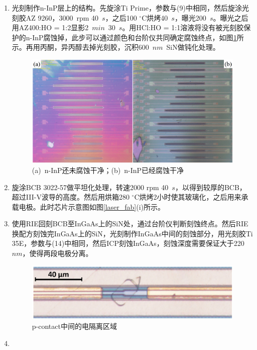 \begin{enumerate}[(1)]
	\item 
	光刻制作n-InP层上的结构。先旋涂Ti Prime，参数与(9)中相同，然后旋涂光刻胶AZ 9260，3000~rpm 40~$s$，之后100 $^{\circ}$C烘烤40~$s$，曝光200~$s$。曝光之后用AZ400:HO = 1:2显影2~$min$~30~$s$。用HCl:HO = 1:1溶液将没有被光刻胶保护的n-InP腐蚀掉，此步可以通过颜色和台阶仪共同确定腐蚀终点，如图\ref{laser_island}所示。再用丙酮，异丙醇去掉光刻胶，沉积600~$nm$~SiN做钝化处理。
	\begin{figure}[htb]
		\centering
		\includegraphics[width=14cm]{./Pictures/laser_island.jpg}
		\captionsetup{justification=centering}
		\caption{(a)~n-InP还未腐蚀干净；(b)~n-InP已经腐蚀干净}
		\label{laser_island}
	\end{figure}
	\item 
	旋涂BCB 3022-57做平坦化处理，转速2000 rpm 40~$s$，以得到较厚的BCB，超过III-V波导的高度。然后用烘箱280 $^{\circ}$C烘烤2小时使其玻璃化，之后用来承载电极。此时芯片示意图如图\ref{laser_fab}(i)所示。
	\item 
	使用RIE回刻BCB至InGaAs上的SiN处，通过台阶仪判断刻蚀终点。然后RIE换配方刻蚀完InGaAs上的SiN，光刻制作InGaAs中间的刻蚀部分，用光刻胶Ti 35E，参数与(14)中相同，然后ICP刻蚀InGaAs，刻蚀深度需要保证大于220~$nm$，使得两段电极分离。
	\begin{figure}[htb]
		\centering
		\includegraphics[width=14cm]{./Pictures/laser_cut.jpg}
		\captionsetup{justification=centering}
		\caption{p-contact中间的电隔离区域}
		\label{laser_cut}
	\end{figure}
	\item 

\end{enumerate}

